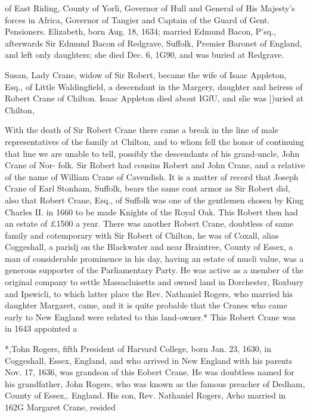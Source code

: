 \documentclass[oneside]{book}
\begin{document}
of East Riding, County of Yorli, Governor of Hull and General 
of His Majesty's forces in Africa, Governor of Tangier and 
Captain of the Guard of Gent. Pensioners. Elizabeth, born Aug. 
18, 1634; married Edmund Bacon, P'sq., afterwards Sir Edmund 
Bacon of Redgrave, Suffolk, Premier Baronet of England, and 
left only daughters; she died Dec. 6, 1G90, and was buried at 
Redgrave. 

Susan, Lady Crane, widow of Sir Robert, became the wife of 
Isaac Appleton, Esq., of Little Waldingfield, a descendant in the 
Margery, daughter and heiress of Robert Crane of Chilton. 
Isaac Appleton died about IGfU, and slie was ])uried at Chilton, 

With the death of Sir Robert Crane there came a break in the 
line of male representatives of the family at Chilton, and to 
wliom fell the honor of continuing that line we are unable to tell, 
possibly the descendants of his grand-uncle, John Crane of Nor- 
folk. Sir Robert had cousins Robert and John Crane, and a 
relative of the name of William Crane of Cavendish. It is a 
matter of record that Joseph Crane of Earl Stonham, Suffolk, 
bears the same coat armor as Sir Robert did, also that Robert 
Crane, Esq., of Suffolk was one of the gentlemen chosen by 
King Charles II. in 1660 to be made Knights of the Royal Oak. 
This Robert then had an estate of £1500 a year. There was 
another Robert Crane, doubtless of same family and cotemporary 
with Sir Robert of Chilton, he was of Coxall, alias Coggeshall, a 
parislj on the Blackwater and near Braintree, County of Essex, a 
man of considerable prominence in his day, having an estate of 
mucli value, was a generous supporter of the Parliamentary 
Party. He was active as a member of the original company to 
settle Massacluisetts and owned land in Dorchester, Roxbury and 
Ipswicli, to which latter place the Rev. Nathaniel Rogers, who 
married his daughter Margaret, came, and it is quite probable 
that the Cranes who came early to New England were related to 
this land-owner.* This Robert Crane was in 1643 appointed a 



*,Tohn Rogers, fifth President of Harvard College, born Jan. 23, 1630, 
in Coggeshall, Essex, England, and who arrived in New England with 
his parents Nov. 17, 1636, was grandson of this Eobert Crane. He was 
doubtless named for his grandfather, John Rogers, who was known as 
the famous preacher of Dedham, County of Essex,. England. His son, 
Rev. Nathaniel Rogers, Avho married in 162G Margaret Crane, resided 
\end{document}
